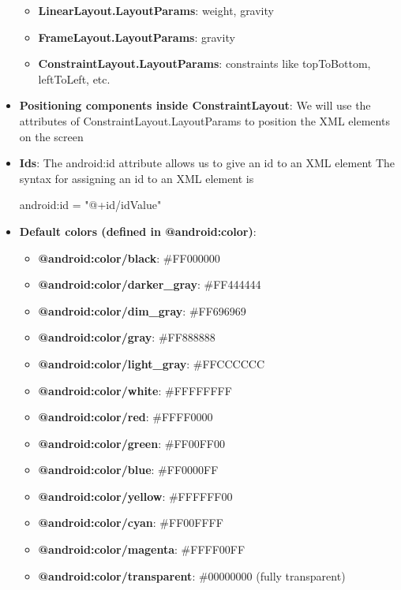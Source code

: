 \documentclass{report}
\begin{document}
\begin{itemize}
\begin{itemize}
                \item \textbf{LinearLayout.LayoutParams}: weight, gravity
                \item \textbf{FrameLayout.LayoutParams}: gravity
                \item \textbf{ConstraintLayout.LayoutParams}: constraints like topToBottom, leftToLeft, etc.
            \end{itemize}
        \item \textbf{Positioning components inside ConstraintLayout}: We will use the attributes of ConstraintLayout.LayoutParams to position the XML elements on the screen
        \item \textbf{Ids}: The android:id attribute allows us to give an id to an XML element
            \bigbreak \noindent 
            The syntax for assigning an id to an XML element is
            \bigbreak \noindent 
            \begin{xmlcode}
            android:id = "@+id/idValue"
            \end{xmlcode}
        \item \textbf{Default colors (defined in @android:color)}:
            \begin{itemize}
                \item \textbf{@android:color/black}: \#FF000000
                \item \textbf{@android:color/darker\_gray}: \#FF444444
                \item \textbf{@android:color/dim\_gray}: \#FF696969
                \item \textbf{@android:color/gray}: \#FF888888
                \item \textbf{@android:color/light\_gray}: \#FFCCCCCC
                \item \textbf{@android:color/white}: \#FFFFFFFF
                \item \textbf{@android:color/red}: \#FFFF0000
                \item \textbf{@android:color/green}: \#FF00FF00
                \item \textbf{@android:color/blue}: \#FF0000FF
                \item \textbf{@android:color/yellow}: \#FFFFFF00
                \item \textbf{@android:color/cyan}: \#FF00FFFF
                \item \textbf{@android:color/magenta}: \#FFFF00FF
                \item \textbf{@android:color/transparent}: \#00000000 (fully transparent)

\end{itemize}
\end{itemize}
\end{document}
